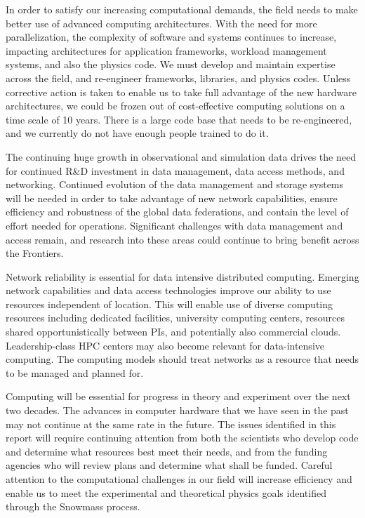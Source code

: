 In order to satisfy our increasing computational demands, the field needs
to make better use of advanced computing architectures. With the need for
more parallelization, the complexity of software and systems continues to
increase, impacting architectures for application frameworks, workload
management systems, and also the physics code. We must develop and maintain
expertise across the field, and re-engineer frameworks, libraries, and
physics codes. Unless corrective action is taken to enable us to take full
advantage of the new hardware architectures, we could be frozen out of 
cost-effective computing solutions on a time scale of 10 years. There is a large
code base that needs to be re-engineered, and we currently do not have
enough people trained to do it.

The continuing huge growth in observational and simulation data drives the
need for continued R\&D investment in data management, data access methods,
and networking. Continued evolution of the data management and storage
systems will be needed in order to take advantage of new network
capabilities, ensure efficiency and robustness of the global data
federations, and contain the level of effort needed for operations.
Significant challenges with data management and access remain, and research
into these areas could continue to bring benefit across the Frontiers.  

Network reliability is essential for data intensive distributed computing.
Emerging network capabilities and data access technologies improve our
ability to use resources independent of location. This will enable use of
diverse computing resources including dedicated facilities, university computing 
centers, resources shared opportunistically between PIs, and potentially 
also commercial clouds. Leadership-class HPC centers may also become 
relevant for data-intensive computing.
The computing models should
treat networks as a resource that needs to be managed and planned for.

Computing will be essential for progress in theory and experiment over the
next two decades. 
The advances in computer hardware that we have seen
in the past may not continue at the same rate in the future. The issues
identified in this report will require continuing attention from both the
scientists who develop code and determine what resources best meet
their needs, and from the funding agencies who will review plans and
determine what shall be funded.
Careful attention to the computational challenges in our field
will increase efficiency and enable us to meet the
experimental and theoretical physics goals identified through the Snowmass process.
